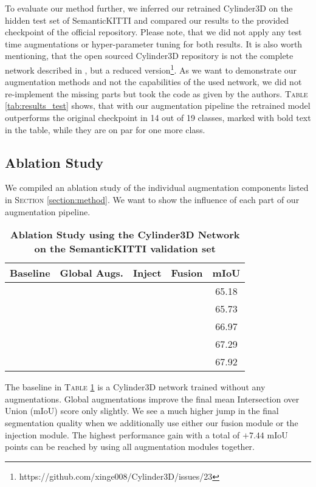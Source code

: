 \documentclass[letterpaper, 10 pt, conference]{ieeeconf}
\begin{document}
To evaluate our method further, we inferred our retrained Cylinder3D on the hidden test set of SemanticKITTI \cite{behley2019semantickitti} and compared our results to the provided checkpoint of the official repository. Please note, that we did not apply any test time augmentations or hyper-parameter tuning for both results. It is also worth mentioning, that the open sourced Cylinder3D repository is not the complete network described in \cite{zhou2020cylinder3d}, but a reduced version\footnote{https://github.com/xinge008/Cylinder3D/issues/23}. As we want to demonstrate our augmentation methods and not the capabilities of the used network, we did not re-implement the missing parts but took the code as given by the authors. \textsc{Table} \ref{tab:results_test} shows, that with our augmentation pipeline the retrained model outperforms the original checkpoint in 14 out of 19 classes, marked with bold text in the table, while they are on par for one more class.



\subsection{Ablation Study}
We compiled an ablation study of the individual augmentation components listed in \textsc{Section} \ref{section:method}. We want to show the influence of each part of our augmentation pipeline.
\begin{table}[!htbp]
	\caption{\textbf{Ablation Study using the Cylinder3D Network on the SemanticKITTI validation set}}
	\begin{tabular}{cccc|c}
		\hline
		Baseline & Global Augs. & Inject & Fusion & mIoU \\
		\hline
		\checkmark &            &            &            & 65.18 \\
		\checkmark & \checkmark &            &            & 65.73 \\
		\checkmark & \checkmark & \checkmark &            & 66.97 \\
		\checkmark & \checkmark &            & \checkmark & 67.29 \\
		\checkmark & \checkmark & \checkmark & \checkmark & 67.92 \\
		\hline
	\end{tabular}
	\centering
	\label{tab:ablation}
\end{table}
The baseline in \textsc{Table} \ref{tab:ablation} is a Cylinder3D network trained without any augmentations. Global augmentations improve the final mean Intersection over Union (mIoU) score only slightly. We see a much higher jump in the final segmentation quality when we additionally use either our fusion module or the injection module. The highest performance gain with a total of $+7.44$ mIoU points can be reached by using all augmentation modules together.
\end{document}
